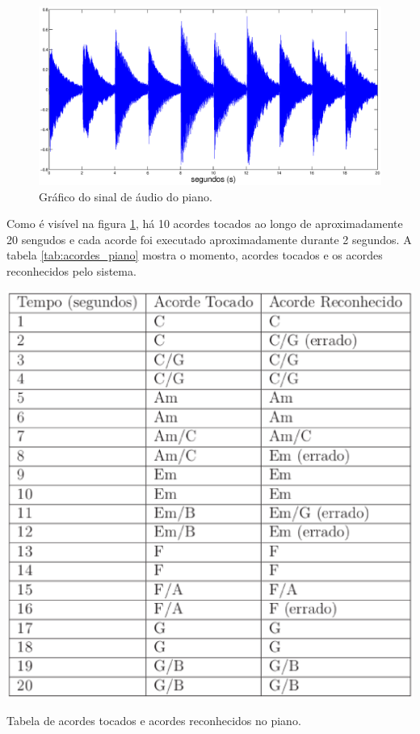 \begin{figure}[h]
    \centering
    \includegraphics[keepaspectratio=true,scale=0.3]{figuras/acordes_piano.eps}
  \caption{Gráfico do sinal de áudio do piano.}
  \label{fig:acordes_piano}
\end{figure}


Como é visível na figura \ref{fig:acordes_piano}, há 10 acordes tocados ao longo de aproximadamente 20 sengudos e cada acorde foi executado aproximadamente durante 2 segundos. A tabela \ref{tab:acordes_piano} mostra o momento, acordes tocados e os acordes reconhecidos pelo sistema.

\begin{table}[h]
\centering
    \includegraphics[keepaspectratio=true,scale=0.5]{figuras/tabela_acordes_piano.eps}
  \caption{Tabela de acordes tocados e acordes reconhecidos no piano.}
  \label{tab:acordes_piano}
\end{table}

